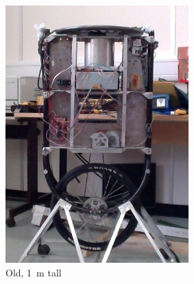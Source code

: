 \documentclass[main.tex]{subfiles}
\begin{document}
	\begin{figure}[!hbt]
		\hspace*{\fill}
		\begin{subfigure}{0.3\linewidth}
			\includegraphics[width=\linewidth]{figures/old.jpg}
			\caption{Old, \SI{1}{\meter} tall}
			\label{fig:uni-old}
		\end{subfigure}%
		\hfill%
		\begin{subfigure}{0.3\linewidth}

\end{subfigure}
\end{figure}
\end{document}
